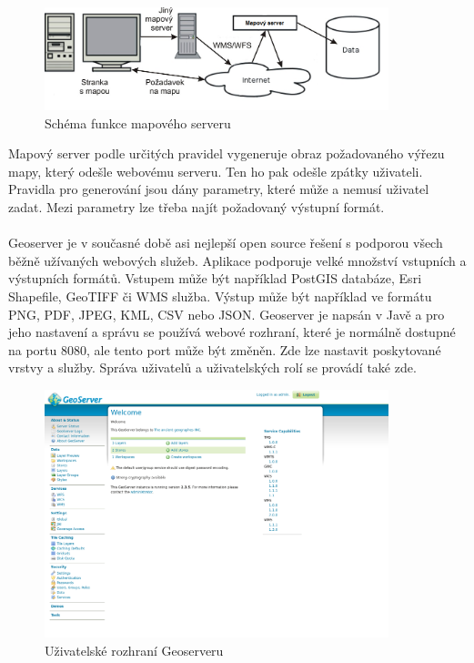 \documentclass[11pt,a4paper,titlepage,oneside]{book}
\begin{document}
		\begin{figure}[!h]
			\begin{center}
				\includegraphics[width=10cm]{obrazky/mapserver.png}
				\caption{Schéma funkce mapového serveru}
				\label{fig:server_schema}
			\end{center}
		\end{figure}
Mapový server podle určitých pravidel vygeneruje obraz požadovaného výřezu mapy, který odešle webovému serveru. Ten ho pak odešle zpátky uživateli. Pravidla pro generování jsou dány parametry, které může a nemusí uživatel zadat. Mezi parametry lze třeba najít požadovaný výstupní formát.




		\paragraph{} Geoserver je v současné době asi nejlepší open source řešení\cite{vorlicek} s  podporou všech běžně užívaných webových služeb. Aplikace podporuje velké množství vstupních a výstupních formátů. Vstupem může být například PostGIS databáze, Esri Shapefile, GeoTIFF či WMS služba. Výstup může být například ve formátu PNG, PDF, JPEG, KML, CSV nebo JSON.  Geoserver je napsán v Javě a pro jeho nastavení a správu se používá webové rozhraní, které je normálně dostupné na portu 8080, ale tento port může být změněn. Zde lze nastavit poskytované vrstvy a služby. Správa uživatelů a uživatelských rolí se provádí také zde. 
		\begin{figure}[!h]
			\begin{center}
				\includegraphics[width=10cm]{obrazky/geoserver.png}
				\caption{Uživatelské rozhraní Geoserveru}
			\end{center}
		\end{figure}
\end{document}
